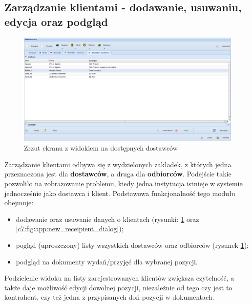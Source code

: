 	\subsection{Zarządzanie klientami - dodawanie, usuwaniu, edycja oraz podgląd}
		\begin{figure}[H]
			\centering
			\includegraphics[width=1.1\textwidth]{images/app/supplier_preview}
			\caption[Aplikacja - Dostęp do danych klientów]{Zrzut ekranu z widokiem na dostępnych dostawców}
			\label{c7:fig:app:supplier_preview}
		\end{figure}
	
		Zarządzanie klientami odbywa się z wydzielonych zakładek, z których jedna przeznaczona jest
		dla \textbf{dostawców}, a druga dla \textbf{odbiorców}. Podejście takie pozwoliło na zobrazowanie problemu,
		kiedy jedna instytucja istnieje w systemie jednocześnie jako dostawca i klient. Podstawowa funkcjonalność tego
		modułu obejmuje:
		\begin{itemize}
			\item dodawanie oraz usuwanie danych o klientach (rysunki: \ref{c7:fig:app:supplier_preview} oraz \ref{c7:fig:app:new_receipient_dialog});
			\item pogląd (uproszczony) listy wszystkich dostawców oraz odbiorców (rysunek \ref{c7:fig:app:supplier_preview});
			\item podgląd na dokumenty wydań/przyjęć dla wybranej pozycji.
		\end{itemize}
		Podzielenie widoku na listy zarejestrowanych klientów zwiększa czytelność, a także daje możliwość edycji dowolnej pozycji,
		niezależnie od tego czy jest to kontrahent, czy też jedna z przypisanych doń pozycji w dokumentach.	
	
